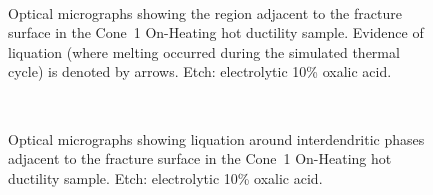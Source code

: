 {%
\begin{figure}
    \centering
     \\
    \caption[Optical micrographs showing the region adjacent to the fracture surface in the Cone~1 On-Heating \protect{} hot ductility sample.]{Optical micrographs showing the region adjacent to the fracture surface in the Cone~1 On-Heating \protect{} hot ductility sample. Evidence of liquation (where melting occurred during the simulated thermal cycle) is denoted by arrows. Etch: electrolytic 10\% oxalic acid.}
    \label{fig:c1-oh-2375}
\end{figure}

\begin{figure}
    \centering
     \\
    \caption{Optical micrographs showing liquation around interdendritic phases adjacent to the fracture surface in the Cone~1 On-Heating \protect{} hot ductility sample. Etch: electrolytic 10\% oxalic acid.}
    \label{fig:c1-oh-2375-fracture-liquation}
\end{figure}

}
